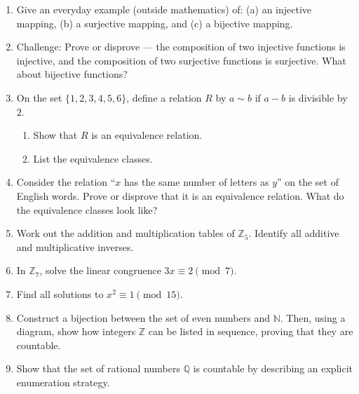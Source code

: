 \begin{enumerate}
  \item Give an everyday example (outside mathematics) of:  
  (a) an injective mapping,  
  (b) a surjective mapping, and  
  (c) a bijective mapping.  

  \item Challenge: Prove or disprove — the composition of two injective functions is injective, 
  and the composition of two surjective functions is surjective. What about bijective functions?  
  
  \item On the set $\{1,2,3,4,5,6\}$, define a relation $R$ by $a \sim b$ if $a-b$ is divisible by $2$. 
        \begin{enumerate}
            \item Show that $R$ is an equivalence relation.
            \item List the equivalence classes.
        \end{enumerate}

  \item Consider the relation ``$x$ has the same number of letters as $y$'' on the set of English words.
        Prove or disprove that it is an equivalence relation. What do the equivalence classes look like?

  \item Work out the addition and multiplication tables of $\mathbb{Z}_5$. Identify all additive and multiplicative inverses.

  \item In $\mathbb{Z}_7$, solve the linear congruence $3x \equiv 2 \pmod{7}$.

  \item Find all solutions to $x^2 \equiv 1 \pmod{15}$. 

  \item Construct a bijection between the set of even numbers and $\mathbb{N}$. 
        Then, using a diagram, show how integers $\mathbb{Z}$ can be listed in sequence, proving that they are countable.


  \item Show that the set of rational numbers $\mathbb{Q}$ is countable by describing an explicit enumeration strategy.


\end{enumerate}
